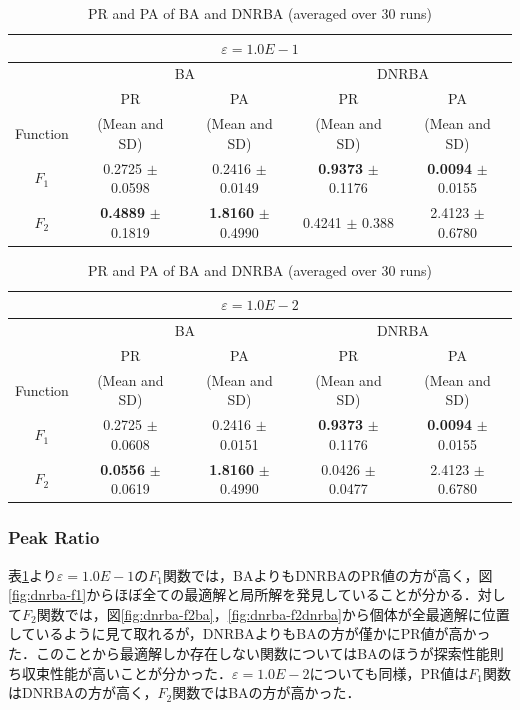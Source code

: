 \documentclass[a4j,11pt]{jarticle}
\begin{document}
\begin{table}[h]
\caption{PR and PA of BA and DNRBA (averaged over 30 runs)}
\begin{center}
\begin{tabular}{c|c|c|c|c}
\multicolumn{5}{c}{$\varepsilon = 1.0E-1$} \\
\hline
\multicolumn{1}{c|}{} & \multicolumn{2}{c|}{BA} & \multicolumn{2}{c}{DNRBA} \\
\hline
 & PR & PA & PR & PA \\

Function & (Mean and SD) & (Mean and SD) & (Mean and SD) & (Mean and SD) \\
\hline
$F_1 $ & 0.2725 $\pm$ 0.0598 & 0.2416 $\pm$ 0.0149 & {\bf 0.9373} $\pm$ 0.1176  & {\bf 0.0094} $\pm$ 0.0155  \\
\hline
$F_2 $ & {\bf 0.4889} $\pm$ 0.1819 & {\bf 1.8160} $\pm$ 0.4990 & 0.4241 $\pm$ 0.388 & 2.4123 $\pm$ 0.6780 \\
\hline

\end{tabular}
\label{tab:dnrba-1}
\end{center}
\end{table}

\begin{table}[h]
\caption{PR and PA of BA and DNRBA (averaged over 30 runs)}
\begin{center}
\begin{tabular}{c|c|c|c|c}
\multicolumn{5}{c}{$\varepsilon = 1.0E-2$} \\
\hline
\multicolumn{1}{c|}{} & \multicolumn{2}{c|}{BA} & \multicolumn{2}{c}{DNRBA} \\
\hline
 & PR & PA & PR & PA \\

Function & (Mean and SD) & (Mean and SD) & (Mean and SD) & (Mean and SD) \\
\hline
$F_1 $ & 0.2725 $\pm$ 0.0608 & 0.2416 $\pm$ 0.0151 & {\bf 0.9373} $\pm$ 0.1176  & {\bf 0.0094} $\pm$ 0.0155  \\
\hline
$F_2 $ & {\bf 0.0556} $\pm$ 0.0619 & {\bf 1.8160} $\pm$ 0.4990 & 0.0426 $\pm$ 0.0477 & 2.4123 $\pm$ 0.6780 \\
\hline

\end{tabular}
\label{tab:dnrba-2}
\end{center}
\end{table}

\subsubsection{Peak Ratio}
表\ref{tab:dnrba-1}より$\varepsilon=1.0E-1$の$F_1$関数では，BAよりもDNRBAのPR値の方が高く，図\ref{fig:dnrba-f1}からほぼ全ての最適解と局所解を発見していることが分かる．対して$F_2$関数では，図\ref{fig:dnrba-f2ba}，\ref{fig:dnrba-f2dnrba}から個体が全最適解に位置しているように見て取れるが，DNRBAよりもBAの方が僅かにPR値が高かった．このことから最適解しか存在しない関数についてはBAのほうが探索性能則ち収束性能が高いことが分かった．$\varepsilon=1.0E-2$についても同様，PR値は$F_1$関数はDNRBAの方が高く，$F_2$関数ではBAの方が高かった．
\end{document}
